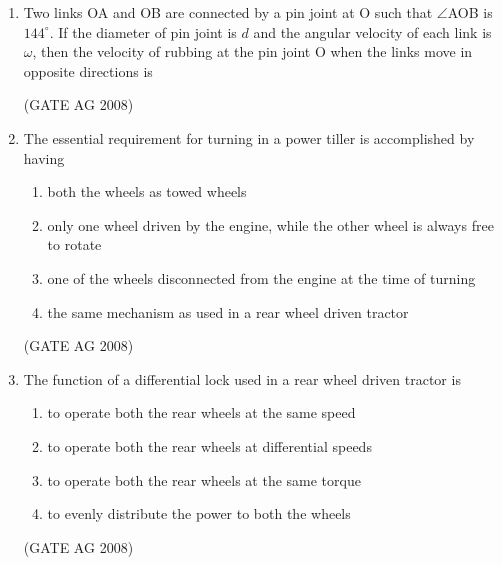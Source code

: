 \documentclass[journal,12pt,onecolumn]{IEEEtran}
\begin{document}
\begin{enumerate}
\item 
 Two links OA and OB are connected by a pin joint at O such that $\angle$AOB is $144^\circ$. If the diameter of pin joint is $d$ and the angular velocity of each link is $\omega$, then the velocity of rubbing at the pin joint O when the links move in opposite directions is 
\begin{enumerate}
\end{enumerate}
\hfill(GATE AG 2008)\\

\medskip

\item 
 The essential requirement for turning in a power tiller is accomplished by having 
\begin{enumerate}
\item  both the wheels as towed wheels
\item  only one wheel driven by the engine, while the other wheel is always free to rotate
\item  one of the wheels disconnected from the engine at the time of turning
\item  the same mechanism as used in a rear wheel driven tractor
\end{enumerate}
\hfill(GATE AG 2008)\\

\medskip

\item 
 The function of a differential lock used in a rear wheel driven tractor is 
\begin{enumerate}
\item  to operate both the rear wheels at the same speed 
\item  to operate both the rear wheels at differential speeds 
\item  to operate both the rear wheels at the same torque 
\item to evenly distribute the power to both the wheels 
\end{enumerate}
\hfill(GATE AG 2008)\\

\medskip


\end{enumerate}
\end{document}
